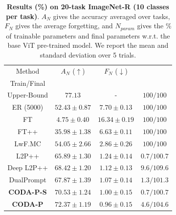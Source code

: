 \begin{table}[t]
\vspace{9mm}
\caption{\textbf{Results (\%) on 20-task ImageNet-R (10 classes per task)}. $A_N$ gives the accuracy averaged over tasks, $F_N$ gives the average forgetting, and $N_{param}$ gives the \% of trainable parameters and final parameters w.r.t. the base ViT pre-trained model. We report the mean and standard deviation over 5 trials.}
\vspace{-2mm}
\centering
\label{tab_2:imnet-r_20}
\begin{tabular}{c||c|c|c} 
\hline
\rule{0pt}{10pt} Method & $A_N$ ($\uparrow$) & $F_N$ ($\downarrow$) & \thead{$N_{param}$ ($\downarrow$) \\ Train/Final}\\
\hline
Upper-Bound  & $77.13$ & - & $100/100$  \\ 
\hline
ER (5000)    & $52.43 \pm 0.87$ & $7.70 \pm 0.13$ & $100/100$  \\ 
FT           & $4.75 \pm 0.40$ & $16.34 \pm 0.19$ & $100/100$  \\ 
FT++         & $35.98 \pm 1.38$ & $6.63 \pm 0.11$ & $100/100$  \\
LwF.MC       & $54.05 \pm 2.66$ & $2.86 \pm 0.26$ & $100/100$  \\
L2P++        & $65.89 \pm 1.30$ & $1.24 \pm 0.14$ & $ 0.7/100.7$  \\
Deep L2P++   & $68.42 \pm 1.20$ & $1.12 \pm 0.13$ & $ 9.6/109.6$  \\ 
DualPrompt   & $67.87 \pm 1.39$ & $1.07 \pm 0.14$ & $ 1.3/101.3$  \\
\hdashline
\textbf{CODA-P-S}  & $70.53 \pm 1.24$ & $1.00 \pm 0.15$ & $ 0.7/100.7$  \\
\textbf{CODA-P}    & $\bm{72.37 \pm 1.19}$ & $\bm{0.96 \pm 0.15}$ & $ 4.6/104.6$  \\

\hline
\end{tabular}
\end{table}







